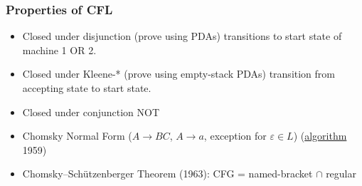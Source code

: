\documentclass[languages_and_machines.tex]{subfiles}
\begin{document}

\begin{frame}
  \frametitle{Properties of CFL}

  \begin{itemize}
  \item Closed under disjunction (prove using PDAs) \pause \emptystr transitions to start state of machine 1 OR 2.
    \pause
  \item Closed under Kleene-* (prove using empty-stack PDAs) \pause \emptystr transition from accepting state to start state.
    \pause
  \item Closed under conjunction \pause NOT
    \pause
  \item Chomsky Normal Form (\(A \to BC\), \(A \to a\), exception for \(\varepsilon \in L\)) (\href{https://en.wikipedia.org/wiki/Chomsky_normal_form\#Converting_a_grammar_to_Chomsky_normal_form}{algorithm} 1959)
    \pause
  \item Chomsky--Sch\"utzenberger Theorem (1963): CFG = named-bracket \(\cap\) regular
  \end{itemize}
\end{frame}
\end{document}

